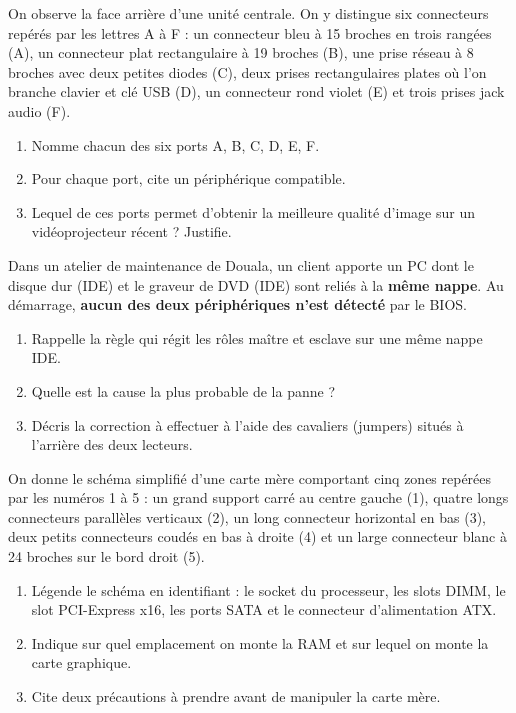 \documentclass[11pt]{article}
\begin{document}
\begin{exercice}
On observe la face arrière d'une unité centrale. On y distingue six connecteurs repérés par les lettres A à F : un connecteur bleu à 15 broches en trois rangées (A), un connecteur plat rectangulaire à 19 broches (B), une prise réseau à 8 broches avec deux petites diodes (C), deux prises rectangulaires plates où l'on branche clavier et clé USB (D), un connecteur rond violet (E) et trois prises jack audio (F).
\begin{enumerate}
  \item Nomme chacun des six ports A, B, C, D, E, F.
  \item Pour chaque port, cite un périphérique compatible.
  \item Lequel de ces ports permet d'obtenir la meilleure qualité d'image sur un vidéoprojecteur récent ? Justifie.
\end{enumerate}
\end{exercice}

\begin{exercice}
Dans un atelier de maintenance de Douala, un client apporte un PC dont le disque dur (IDE) et le graveur de DVD (IDE) sont reliés à la \textbf{même nappe}. Au démarrage, \textbf{aucun des deux périphériques n'est détecté} par le BIOS.
\begin{enumerate}
  \item Rappelle la règle qui régit les rôles maître et esclave sur une même nappe IDE.
  \item Quelle est la cause la plus probable de la panne ?
  \item Décris la correction à effectuer à l'aide des cavaliers (jumpers) situés à l'arrière des deux lecteurs.
\end{enumerate}
\end{exercice}

\begin{exercice}
On donne le schéma simplifié d'une carte mère comportant cinq zones repérées par les numéros 1 à 5 : un grand support carré au centre gauche (1), quatre longs connecteurs parallèles verticaux (2), un long connecteur horizontal en bas (3), deux petits connecteurs coudés en bas à droite (4) et un large connecteur blanc à 24 broches sur le bord droit (5).
\begin{enumerate}
  \item Légende le schéma en identifiant : le socket du processeur, les slots DIMM, le slot PCI-Express x16, les ports SATA et le connecteur d'alimentation ATX.
  \item Indique sur quel emplacement on monte la RAM et sur lequel on monte la carte graphique.
  \item Cite deux précautions à prendre avant de manipuler la carte mère.
\end{enumerate}
\end{exercice}
\end{document}

